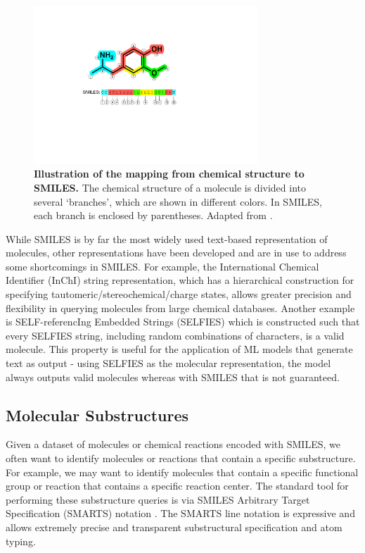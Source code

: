 \begin{figure}[!h]
 \centering
 \includegraphics[width=0.75\textwidth]{Chapters/Background/Figs/smiles.pdf}
 \caption{\label{fig:smiles} \textbf{Illustration of the mapping from chemical structure to SMILES.} The chemical structure of a molecule is divided into several `branches', which are shown in different colors. In SMILES, each branch is enclosed by parentheses. Adapted from \cite{Kim2021GenerativeCT}.}
\end{figure}

While SMILES is by far the most widely used text-based representation of molecules, other representations have been developed and are in use to address some shortcomings in SMILES. For example, the International Chemical Identifier (InChI) \cite{Heller2013InChI} string representation, which has a hierarchical construction for specifying tautomeric/stereochemical/charge states, allows greater precision and flexibility in querying molecules from large chemical databases. Another example is SELF-referencIng Embedded Strings (SELFIES) \cite{Krenn2020Selfies} which is constructed such that every SELFIES string, including random combinations of characters, is a valid molecule. This property is useful for the application of ML models that generate text as output - using SELFIES as the molecular representation, the model always outputs valid molecules whereas with SMILES that is not guaranteed.

\subsection{Molecular Substructures} \label{subsec:smarts}
Given a dataset of molecules or chemical reactions encoded with SMILES, we often want to identify molecules or reactions that contain a specific substructure. For example, we may want to identify molecules that contain a specific functional group or reaction that contains a specific reaction center. The standard tool for performing these substructure queries is via SMILES Arbitrary Target Specification (SMARTS) notation \cite{SMARTS}. The SMARTS line notation is expressive and allows extremely precise and transparent substructural specification and atom typing.

